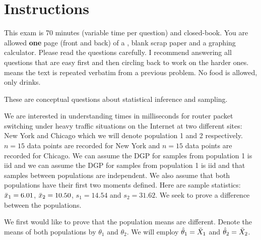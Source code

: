 \documentclass[12pt,landscape]{article}
\begin{document}
\section*{Instructions}
This exam is 70 minutes (variable time per question) and closed-book. You are allowed \textbf{one} page (front and back) of a , blank scrap paper and a graphing calculator. Please read the questions carefully. I recommend answering all questions that are easy first and then circling back to work on the harder ones.  means the text is repeated verbatim from a previous problem. No food is allowed, only drinks. %

\pagebreak

\problem{} These are conceptual questions about statistical inference and sampling.

\vspace{-0.2cm}\benum{}  We are interested in understanding times in milliseconds for router packet switching under heavy traffic situations on the Internet at two different sites: New York and Chicago which we will denote population 1 and 2 respectively. $n=15$ data points are recorded for New York and $n=15$ data points are recorded for Chicago. We can assume the DGP for samples from population 1 is iid and we can assume the DGP for samples from population 1 is iid and that samples between populations are independent. We also assume that both populations have their first two moments defined. Here are sample statistics: $\bar{x}_1 = 6.01$, $\bar{x}_2 = 10.50$, $s_1 = 14.54$ and $s_2 = 31.62$. We seek to prove a difference between the populations.

We first would like to prove that the population means are different. Denote the means of both populations by $\theta_1$ and $\theta_2$. We will employ $\hat{\theta}_1 = \bar{X}_1$ and $\hat{\theta}_2 = \bar{X}_2$.
\end{document}
